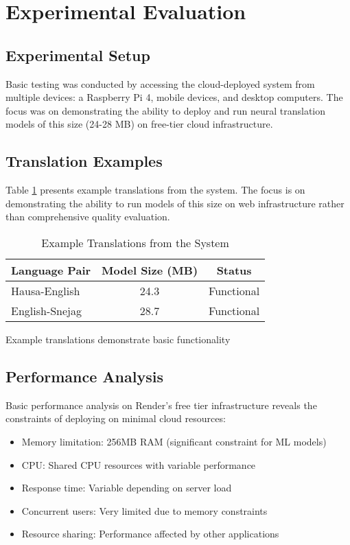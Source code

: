 \documentclass[conference]{IEEEtran}
\begin{document}
\section{Experimental Evaluation}

\subsection{Experimental Setup}

Basic testing was conducted by accessing the cloud-deployed system from multiple devices: a Raspberry Pi 4, mobile devices, and desktop computers. The focus was on demonstrating the ability to deploy and run neural translation models of this size (24-28 MB) on free-tier cloud infrastructure.

\subsection{Translation Examples}

Table \ref{tab:translation-examples} presents example translations from the system. The focus is on demonstrating the ability to run models of this size on web infrastructure rather than comprehensive quality evaluation.

\begin{table}[htbp]
\centering
\caption{Example Translations from the System}
\label{tab:translation-examples}
\begin{tabular}{@{}lcc@{}}
\toprule
Language Pair & Model Size (MB) & Status \\
\midrule
Hausa-English & 24.3 & Functional \\
English-Snejag & 28.7 & Functional \\
\bottomrule
\end{tabular}


\footnotesize
Example translations demonstrate basic functionality
\end{table}

\subsection{Performance Analysis}

Basic performance analysis on Render's free tier infrastructure reveals the constraints of deploying on minimal cloud resources:

\begin{itemize}
    \item Memory limitation: 256MB RAM (significant constraint for ML models)
    \item CPU: Shared CPU resources with variable performance
    \item Response time: Variable depending on server load
    \item Concurrent users: Very limited due to memory constraints
    \item Resource sharing: Performance affected by other applications
\end{itemize}
\end{document}
